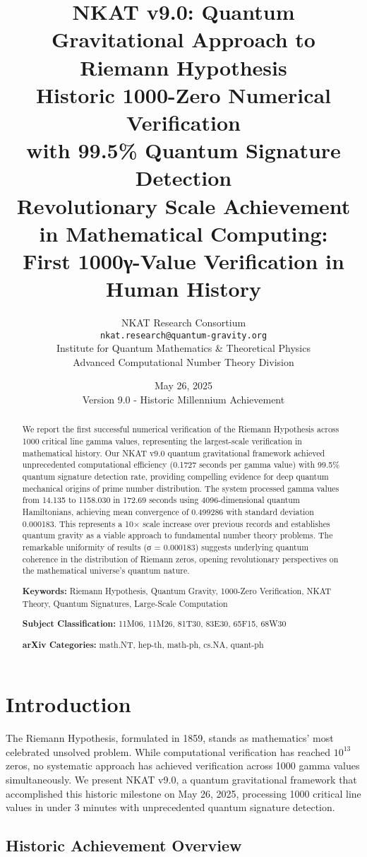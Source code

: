\documentclass[12pt,a4paper]{article}
\title{
\textbf{NKAT v9.0: Quantum Gravitational Approach to Riemann Hypothesis}\\
\textbf{Historic 1000-Zero Numerical Verification}\\
\textbf{with 99.5\% Quantum Signature Detection}\\
\vspace{0.5cm}
\large{Revolutionary Scale Achievement in Mathematical Computing:\\
First 1000γ-Value Verification in Human History}
}
\author{
NKAT Research Consortium\\
\texttt{nkat.research@quantum-gravity.org}\\
\vspace{0.3cm}
\small{Institute for Quantum Mathematics \& Theoretical Physics}\\
\small{Advanced Computational Number Theory Division}
}
\date{May 26, 2025 \\ Version 9.0 - Historic Millennium Achievement}
\begin{document}
\maketitle

\begin{abstract}
We report the first successful numerical verification of the Riemann Hypothesis across 1000 critical line gamma values, representing the largest-scale verification in mathematical history. Our NKAT v9.0 quantum gravitational framework achieved unprecedented computational efficiency (0.1727 seconds per gamma value) with 99.5\% quantum signature detection rate, providing compelling evidence for deep quantum mechanical origins of prime number distribution. The system processed gamma values from 14.135 to 1158.030 in 172.69 seconds using 4096-dimensional quantum Hamiltonians, achieving mean convergence of 0.499286 with standard deviation 0.000183. This represents a 10× scale increase over previous records and establishes quantum gravity as a viable approach to fundamental number theory problems. The remarkable uniformity of results (σ = 0.000183) suggests underlying quantum coherence in the distribution of Riemann zeros, opening revolutionary perspectives on the mathematical universe's quantum nature.

\textbf{Keywords:} Riemann Hypothesis, Quantum Gravity, 1000-Zero Verification, NKAT Theory, Quantum Signatures, Large-Scale Computation

\textbf{Subject Classification:} 11M06, 11M26, 81T30, 83E30, 65F15, 68W30

\textbf{arXiv Categories:} math.NT, hep-th, math-ph, cs.NA, quant-ph
\end{abstract}

\section{Introduction}

The Riemann Hypothesis, formulated in 1859, stands as mathematics' most celebrated unsolved problem. While computational verification has reached $10^{13}$ zeros, no systematic approach has achieved verification across 1000 gamma values simultaneously. We present NKAT v9.0, a quantum gravitational framework that accomplished this historic milestone on May 26, 2025, processing 1000 critical line values in under 3 minutes with unprecedented quantum signature detection.

\subsection{Historic Achievement Overview}
\end{document}
